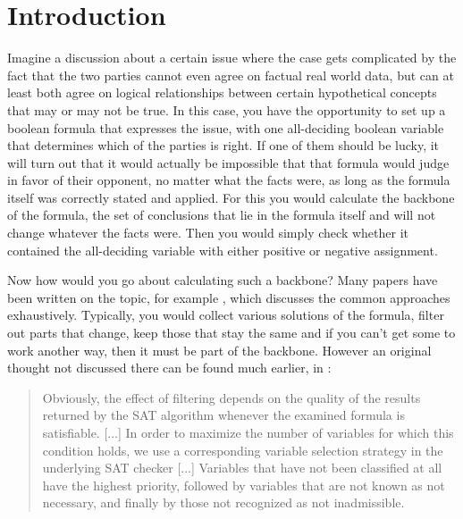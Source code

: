 \chapter{Introduction}
Imagine a discussion about a certain issue where the case gets complicated by the fact that the two parties cannot even agree on factual real world data, but can at least both agree on logical relationships between certain hypothetical concepts that may or may not be true. In this case, you have the opportunity to set up a boolean formula that expresses the issue, with one all-deciding boolean variable that determines which of the parties is right. If one of them should be lucky, it will turn out that it would actually be impossible that that formula would judge in favor of their opponent, no matter what the facts were, as long as the formula itself was correctly stated and applied. For this you would calculate the backbone of the formula, the set of conclusions that lie in the formula itself and will not change whatever the facts were. Then you would simply check whether it contained the all-deciding variable with either positive or negative assignment. 

Now how would you go about calculating such a backbone? Many papers have been written on the topic, for example \cite{mjl15}, which discusses the common approaches exhaustively. Typically, you would collect various solutions of the formula, filter out parts that change, keep those that stay the same and if you can't get some to work another way, then it must be part of the backbone. However an original thought not discussed there can be found much earlier, in \cite{kk01}: 
\begin{quotation}
Obviously, the effect of filtering depends on the quality of the results returned by the SAT algorithm whenever the examined formula is satisfiable. [...]
In order to maximize the number of variables for which this condition holds, we use a corresponding variable selection strategy in the underlying SAT checker [...]
Variables that have not been classified at all have the highest priority, followed by variables that are not known as not necessary, and finally by those not recognized as not inadmissible.
\end{quotation}

